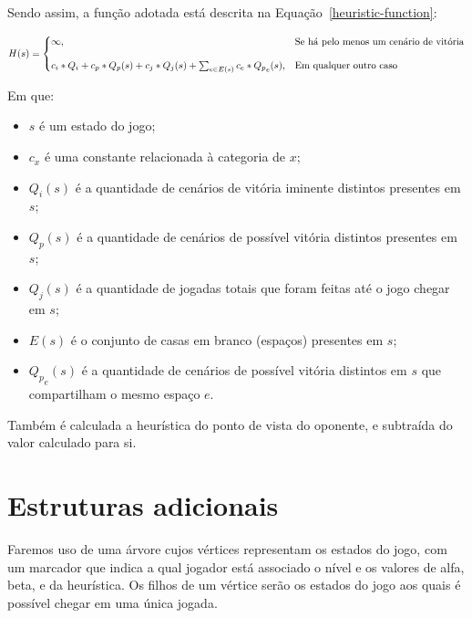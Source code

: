 \documentclass{article}
\begin{document}
    Sendo assim, a função adotada está descrita na Equação~\ref{heuristic-function}:

    \begin{equation}
        H(s) = \begin{cases}
            \infty, & \mbox{Se há pelo menos um cenário de vitória}
                      \vspace{1em} \nonumber \\
            c_i * Q_i + c_p * Q_p(s) + c_j * Q_j(s) + \sum_{e\in E(s)} c_e * {Q_p}_e(s), & \mbox{Em qualquer outro caso} \nonumber \\
        \end{cases}
        \label{heuristic-function}
    \end{equation}

    Em que:

    \begin{itemize}
        \item $s$ é um estado do jogo;
        \item $c_x$ é uma constante relacionada à categoria de $x$;
        \item $Q_i(s)$ é a quantidade de cenários de vitória iminente distintos
        presentes em $s$;
        \item $Q_p(s)$ é a quantidade de cenários de possível vitória distintos
        presentes em $s$;
        \item $Q_j(s)$ é a quantidade de jogadas totais que foram feitas até o
        jogo chegar em $s$;
        \item $E(s)$ é o conjunto de casas em branco (espaços) presentes em $s$;
        \item ${Q_p}_e(s)$ é a quantidade de cenários de possível vitória
        distintos em $s$ que compartilham o mesmo espaço $e$.
    \end{itemize}

    Também é calculada a heurística do ponto de vista do oponente,
    e subtraída do valor calculado para si.

    \section{Estruturas adicionais}

    Faremos uso de uma árvore cujos vértices representam os estados do jogo,
    com um marcador que indica a qual jogador está associado o nível e os
    valores de alfa, beta, e da heurística. Os filhos de um vértice serão os
    estados do jogo aos quais é possível chegar em uma única jogada.
\end{document}
